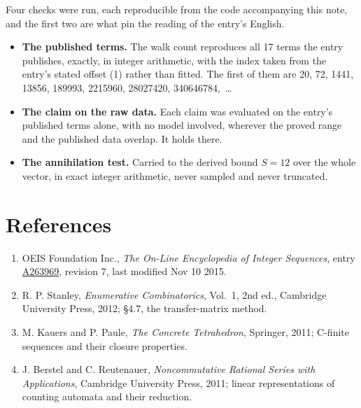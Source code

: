 \documentclass[11pt]{article}
\theoremstyle{definition}
\begin{document}
Four checks were run, each reproducible from the code accompanying this note, and the first two are what pin the reading of the entry's English.

\begin{itemize}

\item {\bfseries The published terms.} The walk count reproduces all 17 terms the entry publishes, exactly, in integer arithmetic, with the index taken from the entry's stated offset (1) rather than fitted. The first of them are 20, 72, 1441, 13856, 189993, 2215960, 28027420, 340646784,~\dots

\item {\bfseries The claim on the raw data.} Each claim was evaluated on the entry's published terms alone, with no model involved, wherever the proved range and the published data overlap. It holds there.

\item {\bfseries The annihilation test.} Carried to the derived bound $S = 12$ over the whole vector, in exact integer arithmetic, never sampled and never truncated.

\end{itemize}

\section{References}

\begin{enumerate}

\item OEIS Foundation Inc., \emph{The On-Line Encyclopedia of Integer Sequences}, entry \href{https://oeis.org/A263969}{A263969}, revision 7, last modified Nov 10 2015.

\item R. P. Stanley, \emph{Enumerative Combinatorics}, Vol.~1, 2nd ed., Cambridge University Press, 2012; \S4.7, the transfer-matrix method.

\item M. Kauers and P. Paule, \emph{The Concrete Tetrahedron}, Springer, 2011; C-finite sequences and their closure properties.

\item J. Berstel and C. Reutenauer, \emph{Noncommutative Rational Series with Applications}, Cambridge University Press, 2011; linear representations of counting automata and their reduction.

\end{enumerate}
\end{document}
